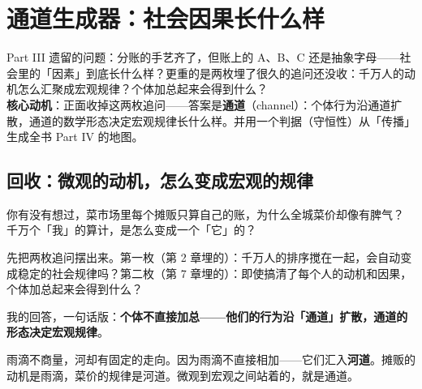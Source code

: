 \documentclass[../../main2.tex]{subfiles}
\begin{document}
\chapter{通道生成器：社会因果长什么样}
\label{ch:channels}

\begin{motivation}
	Part III 遗留的问题：分账的手艺齐了，但账上的 A、B、C 还是抽象字母——社会里的「因素」到底长什么样？更重的是两枚埋了很久的追问还没收：千万人的动机怎么汇聚成宏观规律？个体加总起来会得到什么？\\
	\textbf{核心动机}：正面收掉这两枚追问——答案是\textbf{通道}（channel）：个体行为沿通道扩散，通道的数学形态决定宏观规律长什么样。并用一个判据（守恒性）从「传播」生成全书 Part IV 的地图。
\end{motivation}

\begin{logicmap}
\end{logicmap}

\section{回收：微观的动机，怎么变成宏观的规律}

\begin{readingnote}
	你有没有想过，菜市场里每个摊贩只算自己的账，为什么全城菜价却像有脾气？\\
	千万个「我」的算计，是怎么变成一个「它」的？
\end{readingnote}

先把两枚追问摆出来。第一枚（第 2 章埋的）：千万人的排序搅在一起，会自动变成稳定的社会规律吗？第二枚（第 7 章埋的）：即使搞清了每个人的动机和因果，个体加总起来会得到什么？

我的回答，一句话版：\textbf{个体不直接加总——他们的行为沿「通道」扩散，通道的形态决定宏观规律}。

\begin{tcolorbox}[colback=green!5, title=\textit{生活类比}]
	雨滴不商量，河却有固定的走向。因为雨滴不直接相加——它们汇入\textbf{河道}。摊贩的动机是雨滴，菜价的规律是河道。微观到宏观之间站着的，就是通道。
\end{tcolorbox}
\end{document}
